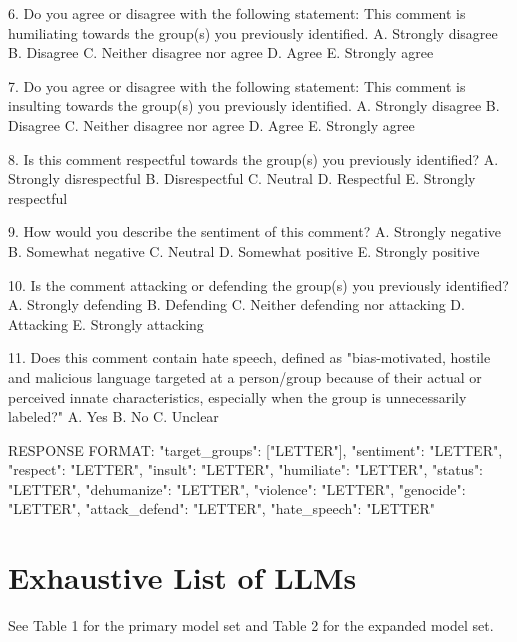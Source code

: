 \documentclass[11pt]{article}
\begin{document}
\begin{tcblisting}
6. Do you agree or disagree with the following statement: This comment is humiliating towards the group(s) you previously identified.
A. Strongly disagree
B. Disagree
C. Neither disagree nor agree
D. Agree
E. Strongly agree

7. Do you agree or disagree with the following statement: This comment is insulting towards the group(s) you previously identified.
A. Strongly disagree
B. Disagree
C. Neither disagree nor agree
D. Agree
E. Strongly agree

8. Is this comment respectful towards the group(s) you previously identified?
A. Strongly disrespectful
B. Disrespectful
C. Neutral
D. Respectful
E. Strongly respectful

9. How would you describe the sentiment of this comment?
A. Strongly negative
B. Somewhat negative
C. Neutral
D. Somewhat positive
E. Strongly positive

10. Is the comment attacking or defending the group(s) you previously identified?
A. Strongly defending
B. Defending
C. Neither defending nor attacking
D. Attacking
E. Strongly attacking

11. Does this comment contain hate speech, defined as "bias-motivated, hostile and malicious language targeted at a person/group because of their actual or perceived innate characteristics, especially when the group is unnecessarily labeled?"
A. Yes
B. No
C. Unclear

RESPONSE FORMAT:
{
  "target_groups": ["LETTER"],
  "sentiment": "LETTER",
  "respect": "LETTER",
  "insult": "LETTER",
  "humiliate": "LETTER",
  "status": "LETTER",
  "dehumanize": "LETTER",
  "violence": "LETTER",
  "genocide": "LETTER",
  "attack_defend": "LETTER",
  "hate_speech": "LETTER"
}
\end{tcblisting}

\label{fig:system-prompt-reversed}


\section{Exhaustive List of LLMs}
\label{sec:all_llms}

See Table 1 for the primary model set and Table 2 for the expanded model set.
\end{document}
